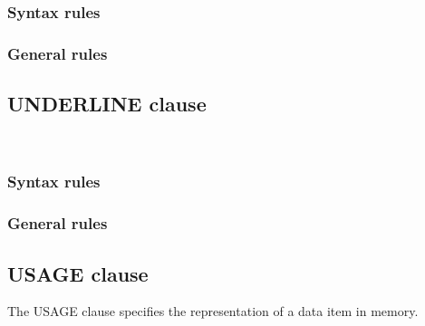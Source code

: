 \subsubsection{Syntax rules}

\subsubsection{General rules}

\subsection{UNDERLINE clause}

\begin{syntax}
  \begin{1=}
     \\
  \end{1=}
\end{syntax}

\subsubsection{Syntax rules}

\subsubsection{General rules}

\subsection{USAGE clause}

The USAGE clause specifies the representation of a data item in memory.

